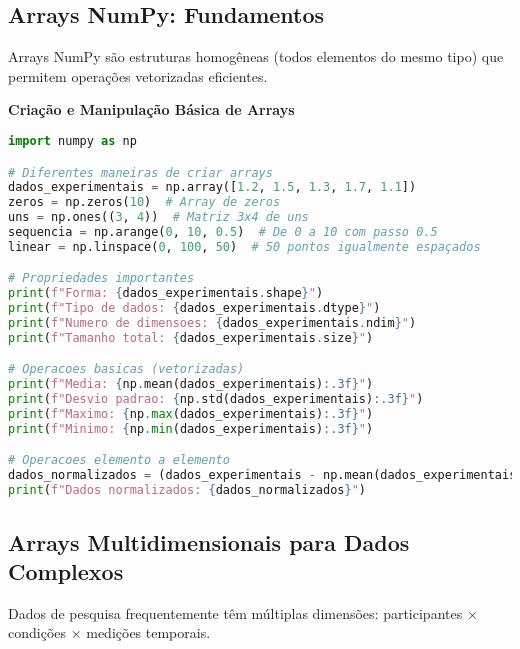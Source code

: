 \subsection{Arrays NumPy: Fundamentos}

Arrays NumPy são estruturas homogêneas (todos elementos do mesmo tipo) que permitem operações vetorizadas eficientes.

\begin{examplebox}
\textbf{Criação e Manipulação Básica de Arrays}

\begin{lstlisting}[language=Python]
import numpy as np

# Diferentes maneiras de criar arrays
dados_experimentais = np.array([1.2, 1.5, 1.3, 1.7, 1.1])
zeros = np.zeros(10)  # Array de zeros
uns = np.ones((3, 4))  # Matriz 3x4 de uns
sequencia = np.arange(0, 10, 0.5)  # De 0 a 10 com passo 0.5
linear = np.linspace(0, 100, 50)  # 50 pontos igualmente espaçados

# Propriedades importantes
print(f"Forma: {dados_experimentais.shape}")
print(f"Tipo de dados: {dados_experimentais.dtype}")
print(f"Numero de dimensoes: {dados_experimentais.ndim}")
print(f"Tamanho total: {dados_experimentais.size}")

# Operacoes basicas (vetorizadas)
print(f"Media: {np.mean(dados_experimentais):.3f}")
print(f"Desvio padrao: {np.std(dados_experimentais):.3f}")
print(f"Maximo: {np.max(dados_experimentais):.3f}")
print(f"Minimo: {np.min(dados_experimentais):.3f}")

# Operacoes elemento a elemento
dados_normalizados = (dados_experimentais - np.mean(dados_experimentais)) / np.std(dados_experimentais)
print(f"Dados normalizados: {dados_normalizados}")
\end{lstlisting}
\end{examplebox}

\subsection{Arrays Multidimensionais para Dados Complexos}

Dados de pesquisa frequentemente têm múltiplas dimensões: participantes × condições × medições temporais.

